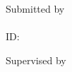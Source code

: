 
\begin{titlepage}
\centering

\vspace*{2cm}

{\fontsize{18}{22}\selectfont\bfseries \ReportTitle}

\vspace{1.5cm}

{\fontsize{14}{17}\selectfont \ReportSubtitle}

\vspace{2cm}

{\fontsize{12}{15}\selectfont
Submitted by \\[6pt]
\ReportAuthor \\[6pt]
ID: \ReportAuthorId
}

\vspace{1.5cm}

{\fontsize{12}{15}\selectfont
Supervised by \\[6pt]
\ReportSupervisor
}

\vfill

{\fontsize{12}{15}\selectfont
\ReportUniversity \\[4pt]
\ReportDepartment \\[4pt]
\ReportDate
}

\end{titlepage}
